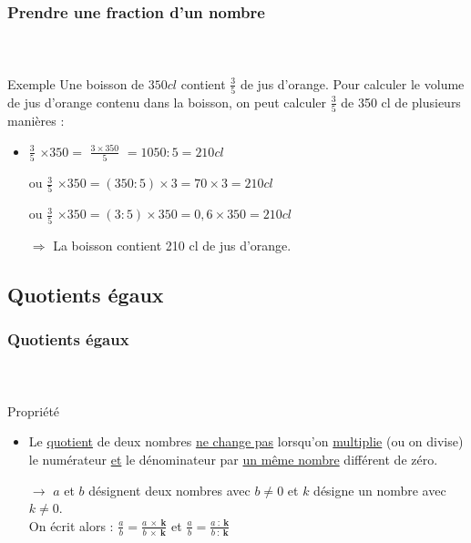 \documentclass{beamer}
\begin{document}
\begin{frame}
	\frametitle{Prendre une fraction d'un nombre}  
	\framesubtitle{\ }
	
	\begin{exampleblock}{Exemple}
	Une boisson de $350 cl$ contient {\LARGE $\frac{3}{5}$} de jus d'orange.
	Pour calculer le volume de jus d'orange contenu dans la boisson, on peut calculer {\LARGE $\frac{3}{5}$} de 350 cl de plusieurs manières :
	
	
		\begin{itemize}
			\item {\LARGE $ \frac{3}{5}$} $ \times 350 = $ {\LARGE $\frac{3 \times 350}{5}$} $ = 1050 : 5 = 210 cl $ 
			\item[ou] {\LARGE $ \frac{3}{5}$} $ \times 350 = (350:5) \times 3 = 70 \times 3 = 210 cl $ 
			\item[ou] {\LARGE $ \frac{3}{5}$} $ \times 350 = (3:5) \times 350 = 0,6 \times 350 = 210 cl $ 
			\item[$\Rightarrow$] La boisson contient 210 cl de jus d'orange.
		\end{itemize}
	\end{exampleblock}
\end{frame}

\subsection{Quotients égaux}

\begin{frame}
	\frametitle{Quotients égaux}  
	\framesubtitle{ \ }	
	
	\begin{block}{Propriété}
		\begin{itemize}
			
		\item Le \underline{quotient} de deux nombres \underline{ne change pas} lorsqu'on \underline{multiplie} (ou on divise) le numérateur \underline{et} le dénominateur par \underline{un même nombre} différent de zéro.\\
		
		\item[$\rightarrow$] $a$ et $b$ désignent deux nombres avec $b \neq 0$ et $k$ désigne un nombre avec $k \neq 0$.\\
		
		On écrit alors : {\LARGE $\frac{a}{b} = \frac{a \: \times  \: \textbf{k}}{b \: \times \: \textbf{k}}$} et {\LARGE $\frac{a}{b} = \frac{a \: : \: \textbf{k}}{b \: : \:\textbf{k}}$}
		\end{itemize}
	\end{block}
	
\end{frame}
\end{document}
